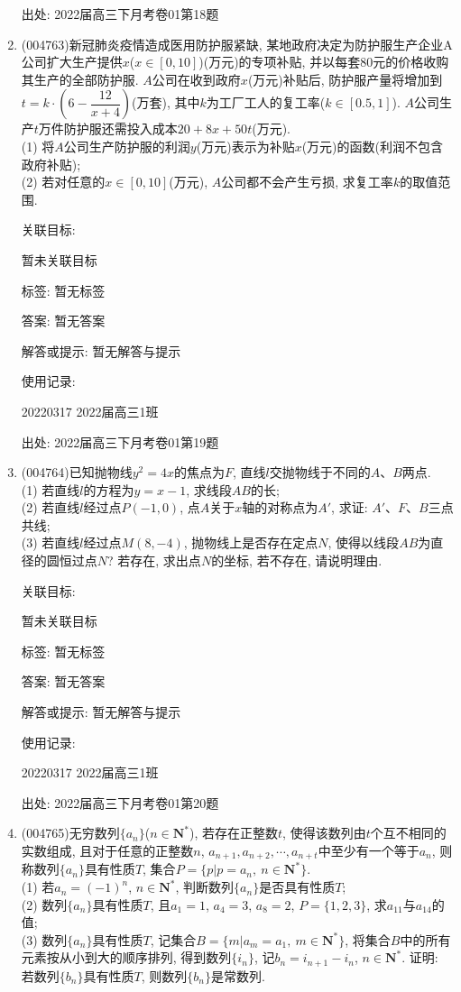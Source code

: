 \documentclass[10pt,a4paper]{article}
\begin{document}
\begin{enumerate}[1.]
出处: 2022届高三下月考卷01第18题
\item { (004763)}新冠肺炎疫情造成医用防护服紧缺, 某地政府决定为防护服生产企业A公司扩大生产提供$x$($x\in [0,10]$)(万元)的专项补贴, 并以每套$80$元的价格收购其生产的全部防护服. $A$公司在收到政府$x$(万元)补贴后, 防护服产量将增加到$t=k\cdot (6-\dfrac{12}{x+4})$(万套), 其中$k$为工厂工人的复工率($k\in [0.5,1]$). $A$公司生产$t$万件防护服还需投入成本$20+8x+50t$(万元).\\
(1) 将$A$公司生产防护服的利润$y$(万元)表示为补贴$x$(万元)的函数(利润不包含政府补贴);\\
(2) 若对任意的$x\in [0,10]$(万元), $A$公司都不会产生亏损, 求复工率$k$的取值范围.


关联目标:

暂未关联目标



标签: 暂无标签

答案: 暂无答案

解答或提示: 暂无解答与提示

使用记录:

20220317	2022届高三1班		


出处: 2022届高三下月考卷01第19题
\item { (004764)}已知抛物线$y^2=4x$的焦点为$F$, 直线$l$交抛物线于不同的$A$、$B$两点.\\
(1) 若直线$l$的方程为$y=x-1$, 求线段$AB$的长;\\
(2) 若直线$l$经过点$P(-1,0)$, 点$A$关于$x$轴的对称点为$A'$, 求证: $A'$、$F$、$B$三点共线;\\
(3) 若直线$l$经过点$M(8,-4)$, 抛物线上是否存在定点$N$, 使得以线段$AB$为直径的圆恒过点$N$? 若存在, 求出点$N$的坐标, 若不存在, 请说明理由.


关联目标:

暂未关联目标



标签: 暂无标签

答案: 暂无答案

解答或提示: 暂无解答与提示

使用记录:

20220317	2022届高三1班			


出处: 2022届高三下月考卷01第20题
\item { (004765)}无穷数列$\{a_n\}$($n\in \mathbf{N}^*$), 若存在正整数$t$, 使得该数列由$t$个互不相同的实数组成, 且对于任意的正整数$n$, $a_{n+1},a_{n+2},\cdots,a_{n+t}$中至少有一个等于$a_n$, 则称数列$\{a_n\}$具有性质$T$, 集合$P=\{p|p=a_n, \ n\in \mathbf{N}^*\}$.\\
(1) 若$a_n=(-1)^n$, $n\in \mathbf{N}^*$, 判断数列$\{a_n\}$是否具有性质$T$;\\
(2) 数列$\{a_n\}$具有性质$T$, 且$a_1=1$, $a_4=3$, $a_8=2$, $P=\{1,2,3\}$, 求$a_{11}$与$a_{14}$的值;\\
(3) 数列$\{a_n\}$具有性质$T$, 记集合$B=\{m|a_m=a_1, \ m\in \mathbf{N}^*\}$, 将集合$B$中的所有元素按从小到大的顺序排列, 得到数列$\{i_n\}$, 记$b_n=i_{n+1}-i_n$, $n\in \mathbf{N}^*$. 证明: 若数列$\{b_n\}$具有性质$T$, 则数列$\{b_n\}$是常数列.



\end{enumerate}
\end{document}
